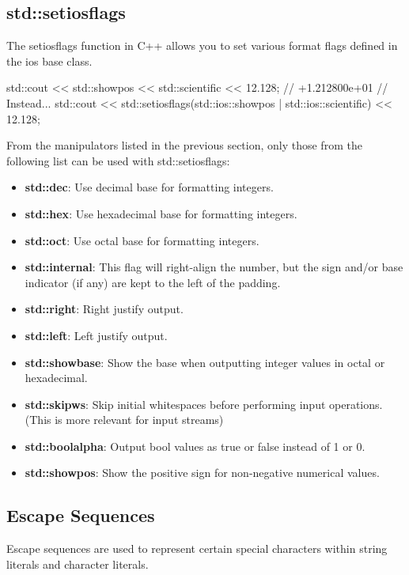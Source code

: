 \documentclass{report}
\begin{document}
    \pagebreak \bigbreak \noindent 
    \subsection{std::setiosflags}
    The setiosflags function in C++ allows you to set various format flags defined in the ios base class. 
    \bigbreak \noindent 
    
    \begin{cppcode}
    std::cout << std::showpos << std::scientific << 12.128; // +1.212800e+01
    // Instead...
    std::cout << std::setiosflags(std::ios::showpos | std::ios::scientific) << 12.128; 
    \end{cppcode}
    
    \bigbreak \noindent 
    From the manipulators listed in the previous section, only those from the following list can be used with std::setiosflags:
    \begin{itemize}
        \item \textbf{std::dec}: Use decimal base for formatting integers.
        \item \textbf{std::hex}: Use hexadecimal base for formatting integers.
        \item \textbf{std::oct}: Use octal base for formatting integers.
        \item \textbf{std::internal}: This flag will right-align the number, but the sign and/or base indicator (if any) are kept to the left of the padding.
        \item \textbf{std::right}: Right justify output.
        \item \textbf{std::left}: Left justify output.
        \item \textbf{std::showbase}: Show the base when outputting integer values in octal or hexadecimal.
        \item \textbf{std::skipws}: Skip initial whitespaces before performing input operations. (This is more relevant for input streams)
        \item \textbf{std::boolalpha}: Output bool values as true or false instead of 1 or 0.
        \item \textbf{std::showpos}: Show the positive sign for non-negative numerical values.
    \end{itemize}

    \bigbreak \noindent 
    \subsection{Escape Sequences}
    \bigbreak \noindent 
    Escape sequences are used to represent certain special characters within string literals and character literals.
    \bigbreak \noindent 
\end{document}
